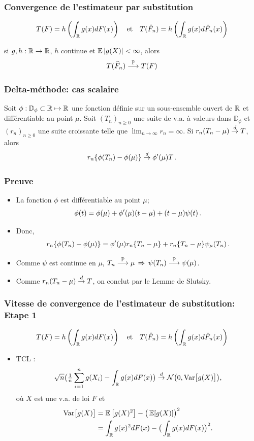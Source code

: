 \begin{frame}
\frametitle{Convergence  de l'estimateur par substitution}
\[
T(F)= h \left( \int_{\mathbb{R}} g(x) dF(x) \right) \quad \text{et} \quad T(\hat{F}_n)= h \left( \int_{\mathbb{R}} g(x) d \hat{F}_n(x) \right)
\]
\begin{theo}[Convergence]
 si $g,h:\operatorname{{\mathbb R}}\rightarrow \operatorname{{\mathbb R}}$, $h$
continue et $\operatorname{{\mathbb E}}|g(X)|<\infty$, alors 
$$
T(\widehat F_n) \stackrel{\operatorname{{\mathbb P}}}{\longrightarrow} T(F)
$$
\end{theo}
\end{frame}

\begin{frame}
\frametitle{Delta-méthode: cas scalaire}
\begin{theo}
Soit $\phi : \mathbb{D}_\phi \subset \mathbb{R} \mapsto \mathbb{R}$ une fonction définie sur un sous-ensemble ouvert de $\mathbb{R}$ et différentiable au point $\mu$. Soit $(T_n)_{n \geq 0}$ une suite de v.a. à valeurs dans $\mathbb{D}_\phi$ et $(r_n)_{n \geq 0}$ une suite croissante telle que $\lim_{n \to \infty} r_n = \infty$. Si $r_n(T_n- \mu) \stackrel{d}{\rightarrow} T$, alors  
$$
r_n \{ \phi(T_n) - \phi(\mu) \} \stackrel{d}{\rightarrow} \phi'(\mu) T \,.
$$
\end{theo}
\end{frame}

\begin{frame}
\frametitle{Preuve}
\begin{itemize}
\item La fonction $\phi$ est différentiable au point $\mu$; 
\[
\phi(t)= \phi(\mu) + \phi'(\mu) (t-\mu) + (t-\mu) \psi(t) \,.
\]
\pause \item Donc, 
\[
r_n \{ \phi(T_n) - \phi(\mu) \} = \phi'(\mu) r_n \{ T_n - \mu \} + r_n \{ T_n - \mu \} \psi_\mu(T_n) \,.
\]
\pause \item Comme $\psi$ est continue en $\mu$, $T_n \stackrel{\operatorname{{\mathbb P}}}{\longrightarrow} \mu \, \Rightarrow \, \psi(T_n) \stackrel{\operatorname{{\mathbb P}}}{\longrightarrow} \psi(\mu)$.
\pause \item Comme $r_n( T_n - \mu) \stackrel{d}{\rightarrow} T$, on conclut par le Lemme de Slutsky.
\end{itemize}
\end{frame}

\begin{frame}
\frametitle{Vitesse de convergence de l'estimateur de substitution: Etape 1}
\[
T(F)= h \left( \int_{\mathbb{R}} g(x) dF(x) \right) \quad \text{et} \quad T(\hat{F}_n)= h \left( \int_{\mathbb{R}} g(x) d \hat{F}_n(x) \right)
\]
\begin{itemize}
\item \alert{TCL} :
$$\sqrt{n}\big(\tfrac{1}{n}\sum_{i=1}^ng(X_i)-\int_{\operatorname{{\mathbb R}}}g(x)dF(x)\big) \stackrel{d}{\rightarrow} {\mathcal N}\big(0,\mathrm{Var}\big[g(X)\big]\big),$$
où $X$ est une v.a. de loi $F$ et
\begin{align*}
\text{Var}\big[g(X)\big] &= \operatorname{{\mathbb E}}\big[g(X)^2\big]-\big(\operatorname{{\mathbb E}}[g(X)]\big)^2 \\
&= \int_{\operatorname{{\mathbb R}}}g(x)^2dF(x)-\big(\int_{\operatorname{{\mathbb R}}}g(x)dF(x)\big)^2.
\end{align*}
\end{itemize}
\end{frame}

